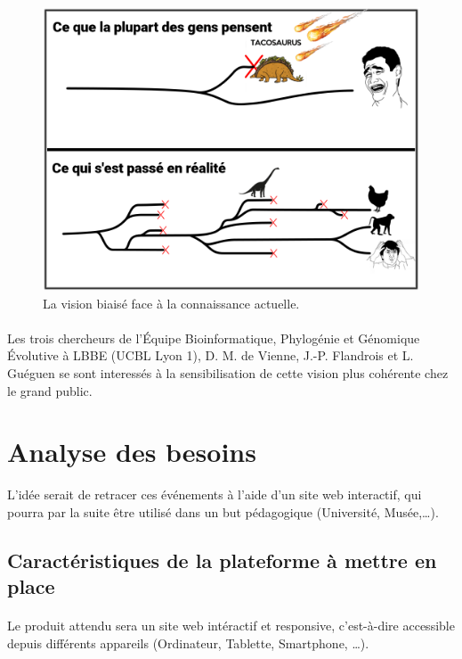 \documentclass[a4paper]{article}
\begin{document}
	\begin{figure}[!h]
		\centering
		\includegraphics[width=12cm]{./img/illustr1.png}
		\caption{La vision biaisé face à la connaissance actuelle.}
		\label{comic1}
	\end{figure}

	\paragraph{}
	Les trois chercheurs de l'Équipe Bioinformatique, Phylogénie et Génomique Évolutive à LBBE (UCBL Lyon 1), D. M. de Vienne, J.-P. Flandrois et L. Guéguen se sont interessés à la sensibilisation de cette vision plus cohérente chez le grand public.

\section{Analyse des besoins}

	L'idée serait de retracer ces événements à l'aide d'un site web interactif, qui pourra par la suite être utilisé dans un but pédagogique (Université, Musée,\ldots).

	\subsection{Caractéristiques de la plateforme à mettre en place}
		\paragraph{}
		Le produit attendu sera un site web intéractif et responsive, c'est-à-dire accessible depuis différents appareils (Ordinateur, Tablette, Smartphone, \ldots).
		
\end{document}

